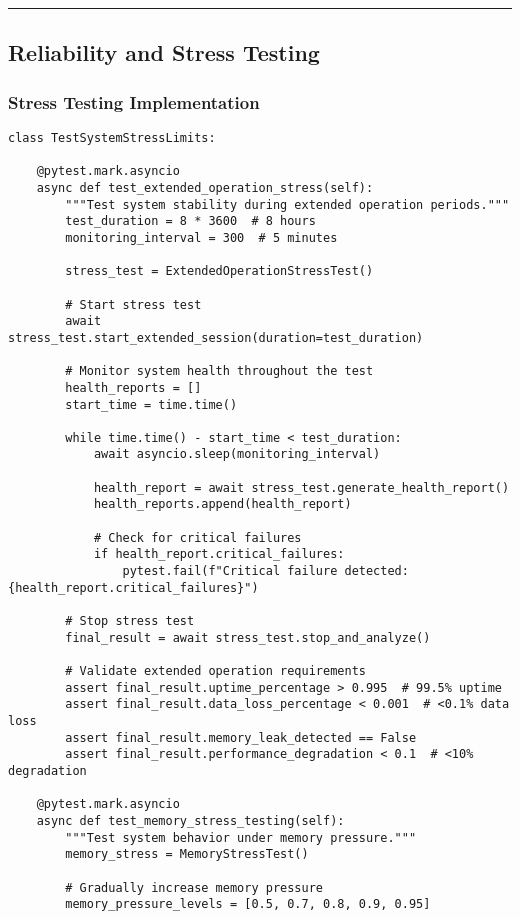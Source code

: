 \documentclass[12pt,a4paper]{report}
\begin{document}
\hrule

\subsection{Reliability and Stress Testing}

\subsubsection{Stress Testing Implementation}

\begin{verbatim}
class TestSystemStressLimits:

    @pytest.mark.asyncio
    async def test_extended_operation_stress(self):
        """Test system stability during extended operation periods."""
        test_duration = 8 * 3600  # 8 hours
        monitoring_interval = 300  # 5 minutes

        stress_test = ExtendedOperationStressTest()

        # Start stress test
        await stress_test.start_extended_session(duration=test_duration)

        # Monitor system health throughout the test
        health_reports = []
        start_time = time.time()

        while time.time() - start_time < test_duration:
            await asyncio.sleep(monitoring_interval)

            health_report = await stress_test.generate_health_report()
            health_reports.append(health_report)

            # Check for critical failures
            if health_report.critical_failures:
                pytest.fail(f"Critical failure detected: {health_report.critical_failures}")

        # Stop stress test
        final_result = await stress_test.stop_and_analyze()

        # Validate extended operation requirements
        assert final_result.uptime_percentage > 0.995  # 99.5% uptime
        assert final_result.data_loss_percentage < 0.001  # <0.1% data loss
        assert final_result.memory_leak_detected == False
        assert final_result.performance_degradation < 0.1  # <10% degradation

    @pytest.mark.asyncio
    async def test_memory_stress_testing(self):
        """Test system behavior under memory pressure."""
        memory_stress = MemoryStressTest()

        # Gradually increase memory pressure
        memory_pressure_levels = [0.5, 0.7, 0.8, 0.9, 0.95]


\end{verbatim}
\end{document}
